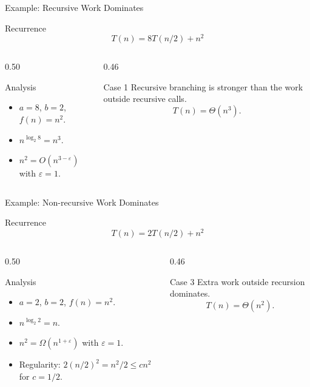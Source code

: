 \documentclass[aspectratio=169]{beamer}
\begin{document}
\begin{frame}{Example: Recursive Work Dominates}
  \small
  \begin{block}{Recurrence}
    \[
      T(n)=8T(n/2)+n^2
    \]
  \end{block}
  \begin{columns}[T]
    \begin{column}{0.50\textwidth}
      \begin{exampleblock}{Analysis}
        \begin{itemize}
          \item $a=8$, $b=2$, $f(n)=n^2$.
          \item $n^{\log_2 8}=n^3$.
          \item $n^2=O(n^{3-\varepsilon})$ with $\varepsilon=1$.
        \end{itemize}
      \end{exampleblock}
    \end{column}
    \begin{column}{0.46\textwidth}
      \begin{alertblock}{Case 1}
        \centering
        Recursive branching is stronger than the work outside recursive calls.
        \[
          T(n)=\Theta(n^3).
        \]
      \end{alertblock}
    \end{column}
  \end{columns}
\end{frame}

\begin{frame}{Example: Non-recursive Work Dominates}
  \small
  \begin{block}{Recurrence}
    \[
      T(n)=2T(n/2)+n^2
    \]
  \end{block}
  \begin{columns}[T]
    \begin{column}{0.50\textwidth}
      \begin{exampleblock}{Analysis}
        \begin{itemize}
          \item $a=2$, $b=2$, $f(n)=n^2$.
          \item $n^{\log_2 2}=n$.
          \item $n^2=\Omega(n^{1+\varepsilon})$ with $\varepsilon=1$.
          \item Regularity: $2(n/2)^2=n^2/2\le c n^2$ for $c=1/2$.
        \end{itemize}
      \end{exampleblock}
    \end{column}
    \begin{column}{0.46\textwidth}
      \begin{alertblock}{Case 3}
        \centering
        Extra work outside recursion dominates.
        \[
          T(n)=\Theta(n^2).
        \]
      \end{alertblock}
    \end{column}
  \end{columns}
\end{frame}
\end{document}
